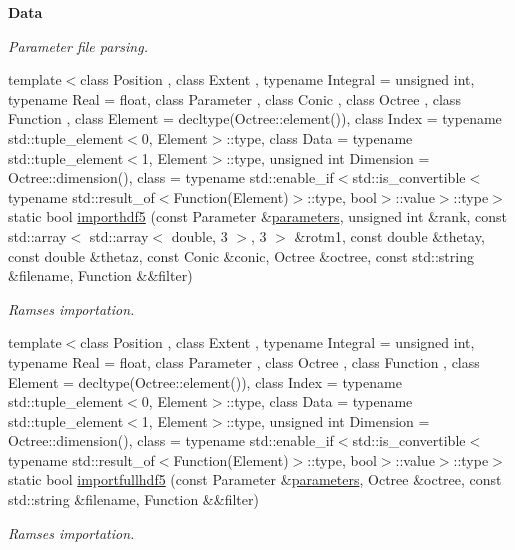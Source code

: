 \begin{Indent}{\bf Data}
\begin{DoxyCompactItemize}
\begin{DoxyCompactList}\small\item\em Parameter file parsing. \end{DoxyCompactList}\item 
{\footnotesize template$<$class Position , class Extent , typename Integral  = unsigned int, typename Real  = float, class Parameter , class Conic , class Octree , class Function , class Element  = decltype(\-Octree\-::element()), class Index  = typename std\-::tuple\-\_\-element$<$0, Element$>$\-::type, class Data  = typename std\-::tuple\-\_\-element$<$1, Element$>$\-::type, unsigned int Dimension = Octree\-::dimension(), class  = typename std\-::enable\-\_\-if$<$std\-::is\-\_\-convertible$<$typename std\-::result\-\_\-of$<$\-Function(\-Element)$>$\-::type, bool$>$\-::value$>$\-::type$>$ }\\static bool \hyperlink{exceptionInput_ae15078f6d2ccb7195a060e6c92b409bd}{importhdf5} (const Parameter \&\hyperlink{rays_8h_ae1bc8b0b8c8b9f8e4cc61a5cc7c4ce9e}{parameters}, unsigned int \&rank, const std\-::array$<$ std\-::array$<$ double, 3 $>$, 3 $>$ \&rotm1, const double \&thetay, const double \&thetaz, const Conic \&conic, Octree \&octree, const std\-::string \&filename, Function \&\&filter)
\begin{DoxyCompactList}\small\item\em Ramses importation. \end{DoxyCompactList}\item 
{\footnotesize template$<$class Position , class Extent , typename Integral  = unsigned int, typename Real  = float, class Parameter , class Octree , class Function , class Element  = decltype(\-Octree\-::element()), class Index  = typename std\-::tuple\-\_\-element$<$0, Element$>$\-::type, class Data  = typename std\-::tuple\-\_\-element$<$1, Element$>$\-::type, unsigned int Dimension = Octree\-::dimension(), class  = typename std\-::enable\-\_\-if$<$std\-::is\-\_\-convertible$<$typename std\-::result\-\_\-of$<$\-Function(\-Element)$>$\-::type, bool$>$\-::value$>$\-::type$>$ }\\static bool \hyperlink{exceptionInput_a771096a84a3d92b2f4ee9bc2a2ad097f}{importfullhdf5} (const Parameter \&\hyperlink{rays_8h_ae1bc8b0b8c8b9f8e4cc61a5cc7c4ce9e}{parameters}, Octree \&octree, const std\-::string \&filename, Function \&\&filter)
\begin{DoxyCompactList}\small\item\em Ramses importation. \end{DoxyCompactList}\item 

\end{DoxyCompactItemize}
\end{Indent}
